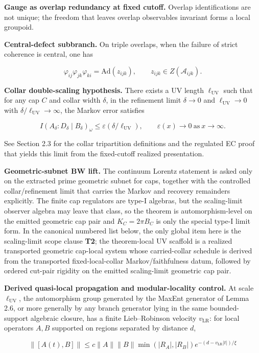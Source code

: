 \textbf{Gauge as overlap redundancy at fixed cutoff.} Overlap identifications are not unique; the freedom that leaves overlap observables invariant forms a local groupoid.

\textbf{Central-defect subbranch.} On triple overlaps, when the failure of strict coherence is central, one has

\[
\varphi_{ij} \varphi_{jk} \varphi_{ki} = \mathrm{Ad}(z_{ijk}),\qquad z_{ijk} \in Z(\mathcal{A}_{ijk}).
\]

\textbf{Collar double-scaling hypothesis.} There exists a UV length \(\ell_{\mathrm{UV}}\) such that for any cap \(C\) and collar width \(\delta\), in the refinement limit \(\delta \to 0\) and \(\ell_{\mathrm{UV}} \to 0\) with \(\delta/\ell_{\mathrm{UV}} \to \infty\), the Markov error satisfies

\[
I(A_\delta:D_\delta \mid B_\delta)_\omega \le \varepsilon(\delta/\ell_{\mathrm{UV}}),
\qquad \varepsilon(x) \to 0 \ \text{as} \ x \to \infty.
\]

See Section 2.3 for the collar tripartition definitions and the regulated EC proof that yields this limit from the fixed-cutoff realized presentation.

\textbf{Geometric-subnet BW lift.} The continuum Lorentz statement is asked only on the extracted prime geometric subnet for caps, together with the controlled collar/refinement limit that carries the Markov and recovery remainders explicitly. The finite cap regulators are type-I algebras, but the scaling-limit observer algebra may leave that class, so the theorem is automorphism-level on the emitted geometric cap pair and \(K_C=2\pi B_C\) is only the special type-I limit form. In the canonical numbered list below, the only global item here is the scaling-limit scope clause \textbf{T2}; the theorem-local UV scaffold is a realized transported geometric cap-local system whose carried-collar schedule is derived from the transported fixed-local-collar Markov/faithfulness datum, followed by ordered cut-pair rigidity on the emitted scaling-limit geometric cap pair.

\textbf{Derived quasi-local propagation and modular-locality control.} At scale \(\ell_{\mathrm{UV}}\), the automorphism group generated by the MaxEnt generator of Lemma 2.6, or more generally by any branch generator lying in the same bounded-support algebraic closure, has a finite Lieb--Robinson velocity \(v_{\mathrm{LR}}\): for local operators \(A, B\) supported on regions separated by distance \(d\),

\[
\|[A(t), B]\| \le c \|A\| \|B\| \min(|R_A|, |R_B|) e^{-(d - v_{\mathrm{LR}}|t|)/\xi}
\]

